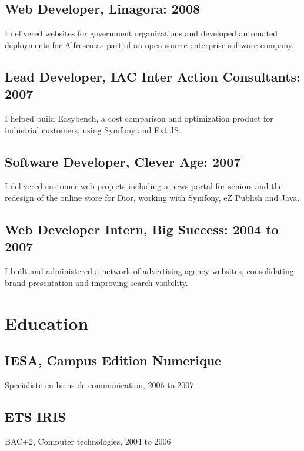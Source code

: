 \documentclass{article}
\begin{document}
\subsection*{Web Developer, Linagora: 2008}
I delivered websites for government organizations and developed automated deployments for Alfresco as part of an open source enterprise software company.

\subsection*{Lead Developer, IAC Inter Action Consultants: 2007}
I helped build Easybench, a cost comparison and optimization product for industrial customers, using Symfony and Ext JS.

\subsection*{Software Developer, Clever Age: 2007}
I delivered customer web projects including a news portal for seniors and the redesign of the online store for Dior, working with Symfony, eZ Publish and Java.

\subsection*{Web Developer Intern, Big Success: 2004 to 2007}
I built and administered a network of advertising agency websites, consolidating brand presentation and improving search visibility.

\section*{Education}
\subsection*{IESA, Campus Edition Numerique}
Specialiste en biens de communication, 2006 to 2007

\subsection*{ETS IRIS}
BAC+2, Computer technologies, 2004 to 2006
\end{document}
